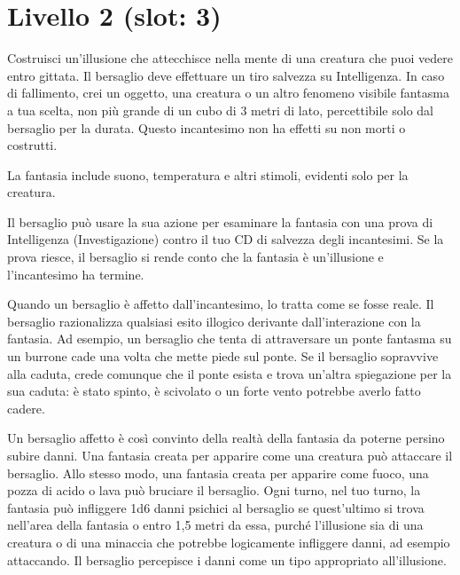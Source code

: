\documentclass[letterpaper,twocolumn,openany,nodeprecatedcode,justified]{dndbook}
\begin{document}
\section{Livello 2 (slot: 3)}


Costruisci un'illusione che attecchisce nella mente di una creatura che puoi vedere entro gittata. Il bersaglio deve effettuare un tiro salvezza su Intelligenza. In caso di fallimento, crei un oggetto, una creatura o un altro fenomeno visibile fantasma a tua scelta, non più grande di un cubo di 3 metri di lato, percettibile solo dal bersaglio per la durata. Questo incantesimo non ha effetti su non morti o costrutti.

La fantasia include suono, temperatura e altri stimoli, evidenti solo per la creatura.

Il bersaglio può usare la sua azione per esaminare la fantasia con una prova di Intelligenza (Investigazione) contro il tuo CD di salvezza degli incantesimi. Se la prova riesce, il bersaglio si rende conto che la fantasia è un'illusione e l'incantesimo ha termine.

Quando un bersaglio è affetto dall'incantesimo, lo tratta come se fosse reale. Il bersaglio razionalizza qualsiasi esito illogico derivante dall'interazione con la fantasia. Ad esempio, un bersaglio che tenta di attraversare un ponte fantasma su un burrone cade una volta che mette piede sul ponte. Se il bersaglio sopravvive alla caduta, crede comunque che il ponte esista e trova un'altra spiegazione per la sua caduta: è stato spinto, è scivolato o un forte vento potrebbe averlo fatto cadere.

Un bersaglio affetto è così convinto della realtà della fantasia da poterne persino subire danni. Una fantasia creata per apparire come una creatura può attaccare il bersaglio. Allo stesso modo, una fantasia creata per apparire come fuoco, una pozza di acido o lava può bruciare il bersaglio. Ogni turno, nel tuo turno, la fantasia può infliggere 1d6 danni psichici al bersaglio se quest'ultimo si trova nell'area della fantasia o entro 1,5 metri da essa, purché l'illusione sia di una creatura o di una minaccia che potrebbe logicamente infliggere danni, ad esempio attaccando. Il bersaglio percepisce i danni come un tipo appropriato all'illusione.

\end{document}
